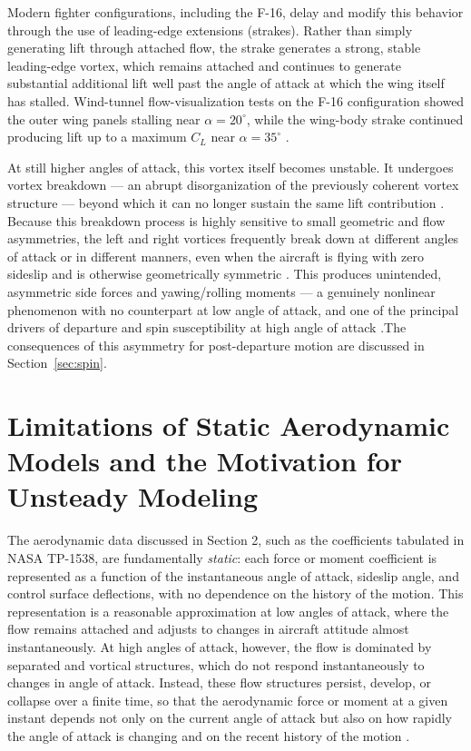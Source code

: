 \documentclass[
bindingoffset=5mm,  %
footnoteindent=3mm, %
hyphenation=true    %
]{src/wut-thesis}
\begin{document}
 Modern fighter configurations, including the F-16, delay and modify this behavior through the use of leading-edge extensions (strakes). Rather than simply generating lift through attached flow, the strake generates a strong, stable leading-edge vortex, which remains attached and continues to generate substantial additional lift well past the angle of attack at which the wing itself has stalled. Wind-tunnel flow-visualization tests on the F-16 configuration showed the outer wing panels stalling near $\alpha = 20^{\circ}$, while the wing-body strake continued producing lift up to a maximum $C_L$ near $\alpha = 35^{\circ}$ \cite[Sec.~``Longitudinal Characteristics,'' Fig.~9]{nguyen1979}.

 At still higher angles of attack, this vortex itself becomes unstable. It undergoes vortex breakdown --- an abrupt disorganization of the previously coherent vortex structure --- beyond which it can no longer sustain the same lift contribution \cite{sedlacek2023}. Because this breakdown process is highly sensitive to small geometric and flow asymmetries, the left and right vortices frequently break down at different angles of attack or in different manners, even when the aircraft is flying with zero sideslip and is otherwise geometrically symmetric \cite{sedlacek2023}. This produces unintended, asymmetric side forces and yawing/rolling moments --- a genuinely nonlinear phenomenon with no counterpart at low angle of attack, and one of the principal drivers of departure and spin susceptibility at high angle of attack \cite{nguyen1979}.The consequences of this asymmetry for post-departure motion are discussed in Section~\ref{sec:spin}.
 
 \section{Limitations of Static Aerodynamic Models and the Motivation for Unsteady Modeling}
 
 The aerodynamic data discussed in Section 2, such as the coefficients tabulated in NASA TP-1538, are fundamentally \emph{static}: each force or moment coefficient is represented as a function of the instantaneous angle of attack, sideslip angle, and control surface deflections, with no dependence on the history of the motion. This representation is a reasonable approximation at low angles of attack, where the flow remains attached and adjusts to changes in aircraft attitude almost instantaneously. At high angles of attack, however, the flow is dominated by separated and vortical structures, which do not respond instantaneously to changes in angle of attack. Instead, these flow structures persist, develop, or collapse over a finite time, so that the aerodynamic force or moment at a given instant depends not only on the current angle of attack but also on how rapidly the angle of attack is changing and on the recent history of the motion \cite{iliff1996}.
 
\end{document}
